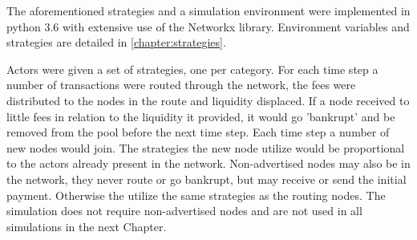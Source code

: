 The aforementioned strategies and a simulation environment were implemented in python 3.6 with extensive use of the Networkx library. Environment variables and strategies are detailed in \ref{chapter:strategies}. 

Actors were given a set of strategies, one per category. For each time step a number of transactions were routed through the network, the fees were distributed to the nodes in the route and liquidity displaced. If a node received to little fees in relation to the liquidity it provided, it would go 'bankrupt' and be removed from the pool before the next time step. Each time step a number of new nodes would join. The strategies the new node utilize would be proportional to the actors already present in the network. Non-advertised nodes may also be in the network, they never route or go bankrupt, but may receive or send the initial payment. Otherwise the utilize the same strategies as the routing nodes. The simulation does not require non-advertised nodes and are not used in all simulations in the next Chapter. 




